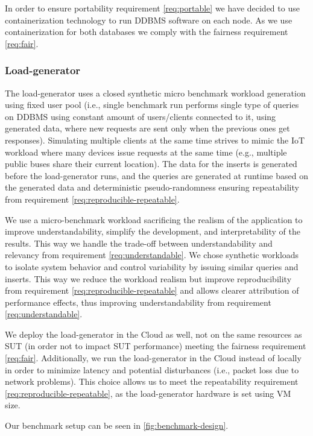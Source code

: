 In order to ensure portability requirement \ref{req:portable} we have decided to use containerization technology to run DDBMS software on each node.
As we use containerization for both databases we comply with the fairness requirement \ref{req:fair}.

\subsubsection{Load-generator}
The load-generator uses a closed synthetic micro benchmark workload generation using fixed user pool
(i.e., single benchmark run performs single type of queries on DDBMS using constant amount of users/clients connected to it, using generated data, where new requests are sent only when the previous ones get responses).
Simulating multiple clients at the same time strives to mimic the IoT workload where many devices issue requests at the same time (e.g., multiple public buses share their current location).
The data for the inserts is generated before the load-generator runs, and the queries are generated at runtime based on the generated data and deterministic pseudo-randomness ensuring repeatability from requirement \ref{req:reproducible-repeatable}.

We use a micro-benchmark workload sacrificing the realism of the application to improve understandability, simplify the development, and interpretability of the results. This way we handle the trade-off between understandability and relevancy from requirement \ref{req:understandable}.
We chose synthetic workloads to isolate system behavior and control variability by issuing similar queries and inserts.
This way we reduce the workload realism but improve reproducibility from requirement \ref{req:reproducible-repeatable} and allows clearer attribution of performance effects, thus improving understandability from requirement \ref{req:understandable}.

We deploy the load-generator in the Cloud as well, not on the same resources as SUT (in order not to impact SUT performance) meeting the fairness requirement \ref{req:fair}.
Additionally, we run the load-generator in the Cloud instead of locally in order to minimize latency and potential disturbances (i.e., packet loss due to network problems).
This choice allows us to meet the repeatability requirement \ref{req:reproducible-repeatable}, as the load-generator hardware is set using VM size.

Our benchmark setup can be seen in \cref{fig:benchmark-design}.

